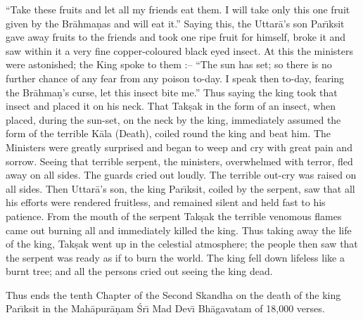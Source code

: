 ``Take these fruits and let all my friends eat them. I will take only this one fruit given by the Br\=ahma\d{n}as and will eat it.'' Saying this, the Uttar\=a's son Par\={\i}ksit gave away fruits to the friends and took one ripe fruit for himself, broke it and saw within it a very fine copper-coloured black eyed insect. At this the ministers were astonished; the King spoke to them :-- ``The sun has set; so there is no further chance of any fear from any poison to-day. I speak then to-day, fearing the Br\=ahma\d{n}'s curse, let this insect bite me.'' Thus saying the king took that insect and placed it on his neck. That Tak\d{s}ak in the form of an insect, when placed, during the sun-set, on the neck by the king, immediately assumed the form of the terrible K\=ala (Death), coiled round the king and beat him. The Ministers were greatly surprised and began to weep and cry with great pain and sorrow. Seeing that terrible serpent, the ministers, overwhelmed with terror, fled away on all sides. The guards cried out loudly. The terrible out-cry was raised on all sides. Then Uttar\=a's son, the king Par\={\i}ksit, coiled by the serpent, saw that all his efforts were rendered fruitless, and remained silent and held fast to his patience. From the mouth of the serpent Tak\d{s}ak the terrible venomous flames came out burning all and immediately killed the king. Thus taking away the life of the king, Tak\d{s}ak went up in the celestial atmosphere; the people then saw that the serpent was ready as if to burn the world. The king fell down lifeless like a burnt tree; and all the persons cried out seeing the king dead.

Thus ends the tenth Chapter of the Second Skandha on the death of the king Par\={\i}ksit in the Mah\=apur\=a\d{n}am \'Sr\={\i} Mad Dev\={\i} Bh\=agavatam of 18,000 verses.




